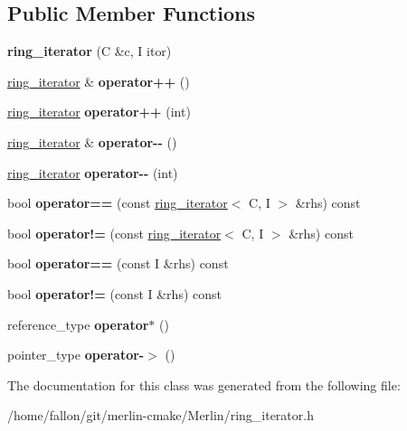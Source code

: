 \subsection*{Public Member Functions}
\begin{DoxyCompactItemize}
\item 
\mbox{\label{classring__iterator_a0fead78976a8e740747f436f015607eb}} 
{\bfseries ring\+\_\+iterator} (C \&c, I itor)
\item 
\mbox{\label{classring__iterator_a4ed73551b095f62062bfbb7808989c65}} 
\hyperlink{classring__iterator}{ring\+\_\+iterator} \& {\bfseries operator++} ()
\item 
\mbox{\label{classring__iterator_a52d59f39ea4db745643355d0ee905c35}} 
\hyperlink{classring__iterator}{ring\+\_\+iterator} {\bfseries operator++} (int)
\item 
\mbox{\label{classring__iterator_a750a42029eccecce7db1db9efb5c91cc}} 
\hyperlink{classring__iterator}{ring\+\_\+iterator} \& {\bfseries operator-\/-\/} ()
\item 
\mbox{\label{classring__iterator_a63afb552d78862d8bcc3d2c0a407fe64}} 
\hyperlink{classring__iterator}{ring\+\_\+iterator} {\bfseries operator-\/-\/} (int)
\item 
\mbox{\label{classring__iterator_a954a3dad1da5910d45d5bbe664a9a609}} 
bool {\bfseries operator==} (const \hyperlink{classring__iterator}{ring\+\_\+iterator}$<$ C, I $>$ \&rhs) const
\item 
\mbox{\label{classring__iterator_a0bcf181e94d6fb5fecc0359a53373aa0}} 
bool {\bfseries operator!=} (const \hyperlink{classring__iterator}{ring\+\_\+iterator}$<$ C, I $>$ \&rhs) const
\item 
\mbox{\label{classring__iterator_a3d89bbb31eea08684acb4762664f63e3}} 
bool {\bfseries operator==} (const I \&rhs) const
\item 
\mbox{\label{classring__iterator_a98440a5e8c28be6b9f85516bcc3dc950}} 
bool {\bfseries operator!=} (const I \&rhs) const
\item 
\mbox{\label{classring__iterator_a25253524a00c90cd566015af32debc21}} 
reference\+\_\+type {\bfseries operator$\ast$} ()
\item 
\mbox{\label{classring__iterator_a3ed14676d771e9b459139137cd254fb5}} 
pointer\+\_\+type {\bfseries operator-\/$>$} ()
\end{DoxyCompactItemize}


The documentation for this class was generated from the following file\+:\begin{DoxyCompactItemize}
\item 
/home/fallon/git/merlin-\/cmake/\+Merlin/ring\+\_\+iterator.\+h\end{DoxyCompactItemize}
